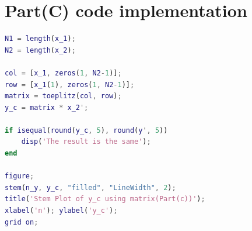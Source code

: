 \documentclass[a4paper,12pt]{article}
\begin{document}
\section{Part(C) code implementation}
\begin{lstlisting}[language=matlab, caption=MATLAB Code, basicstyle=\ttfamily\small, breaklines=true, frame=single]
%%part(c)
N1 = length(x_1);
N2 = length(x_2);

col = [x_1, zeros(1, N2-1)];
row = [x_1(1), zeros(1, N2-1)];
matrix = toeplitz(col, row);
y_c = matrix * x_2';

if isequal(round(y_c, 5), round(y', 5))
    disp('The result is the same');
end

figure;
stem(n_y, y_c, "filled", "LineWidth", 2);
title('Stem Plot of y_c using matrix(Part(c))');
xlabel('n'); ylabel('y_c');
grid on;
\end{lstlisting}
\end{document}
